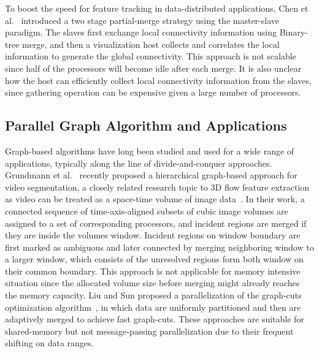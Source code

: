 To boost the speed for feature tracking in data-distributed applications, Chen et al.~\cite{Chen03realtime} introduced a two stage partial-merge strategy using the master-slave paradigm. The slaves first exchange local connectivity information using Binary-tree merge, and then a visualization host collects and correlates the local information to generate the global connectivity. This approach is not scalable since half of the processors will become idle after each merge. It is also unclear how the host can efficiently collect local connectivity information from the slaves, since gathering operation can be expensive given a large number of processors.

\subsection{Parallel Graph Algorithm and Applications}

Graph-based algorithms have long been studied and used for a wide range of applications, typically along the line of divide-and-conquer approaches. Grundmann et al.~\cite{36247} recently proposed a hierarchical graph-based approach for video segmentation, a closely related research topic to 3D flow feature extraction as video can be treated as a space-time volume of image data~\cite{Klein2002}. In their work, a connected sequence of time-axis-aligned subsets of cubic image volumes are assigned to a set of corresponding processors, and incident regions are merged if they are inside the volumes window. Incident regions on window boundary are first marked as ambiguous and later connected by merging neighboring window to a larger window, which consists of the unresolved regions form both window on their common boundary. This approach is not applicable for memory intensive situation since the allocated volume size before merging might already reaches the memory capacity. Liu and Sun \cite{Liu2010} proposed a parallelization of the graph-cuts optimization algorithm~\cite{Boykov2004}, in which data are uniformly partitioned and then are adaptively merged to achieve fast graph-cuts. These approaches are suitable for shared-memory but not message-passing parallelization due to their frequent shifting on data ranges.

